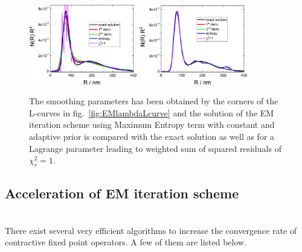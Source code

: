 \begin{figure}[htb]
\centering
\includegraphics[width=0.42\textwidth]{../images/form_factor/EM/EMconstNRR3.png}\hspace{0.06\textwidth}
\includegraphics[width=0.42\textwidth]{../images/form_factor/EM/EMadaptiveNRR3.png}
\caption{The smoothing parameters has been obtained by the corners of the L-curves in fig.\ \ref{fig:EMlambdaLcurve} and the solution of the EM iteration scheme using Maximum Entropy term with constant and adaptive prior is compared with the exact solution as well as for a Lagrange parameter leading to weighted sum of squared residuals of $\chi_r^2=1$.\label{fig:EMconstadaptiveNRR3}}
\end{figure}


\subsection{Acceleration of EM iteration scheme} ~\\
There exist several very efficient algorithms to increase the convergence rate of contractive fixed point operators. A few of them are listed below.

